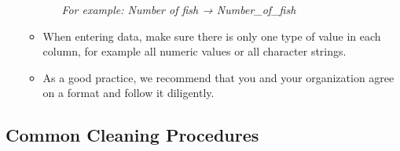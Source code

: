 \documentclass[
]{book}
\begin{document}
\begin{enumerate}
\begin{itemize}
\begin{itemize}
      \emph{For example: Number of fish → Number\_of\_fish}
    \end{itemize}
  \item
    When entering data, make sure there is only one type of value in each column, for example all numeric values or all character strings.
  \item
    As a good practice, we recommend that you and your organization agree on a format and follow it diligently.
  \end{itemize}
\end{enumerate}

\hypertarget{common-cleaning-procedures}{%
\subsection{Common Cleaning Procedures}\label{common-cleaning-procedures}}
\end{document}
